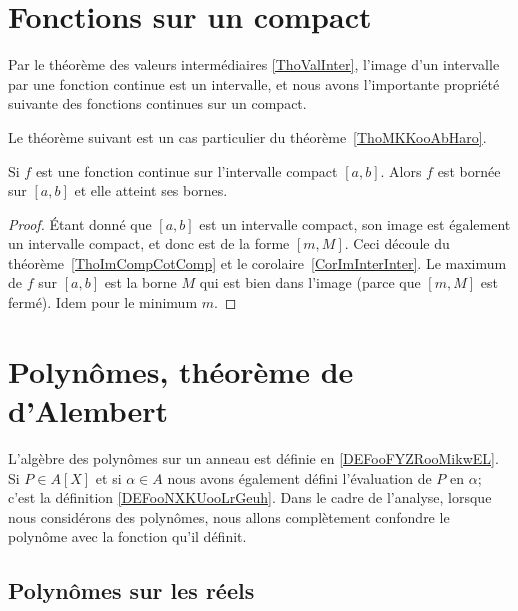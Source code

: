 \section{Fonctions sur un compact}

Par le théorème des valeurs intermédiaires \ref{ThoValInter}, l'image d'un intervalle par une fonction continue est un intervalle, et nous avons l'importante propriété suivante des fonctions continues sur un compact.

Le théorème suivant est un cas particulier du théorème~\ref{ThoMKKooAbHaro}.
\begin{theorem}
    Si $f$ est une fonction continue sur l'intervalle compact $[a,b]$. Alors $f$ est bornée sur $[a,b]$ et elle atteint ses bornes.
\end{theorem}

\begin{proof}
    Étant donné que $[a,b]$ est un intervalle compact, son image est également un intervalle compact, et donc est de la forme $[m,M]$. Ceci découle du théorème~\ref{ThoImCompCotComp} et le corolaire~\ref{CorImInterInter}. Le maximum de $f$ sur $[a,b]$ est la borne $M$ qui est bien dans l'image (parce que $[m,M]$ est fermé). Idem pour le minimum $m$.
\end{proof}

\section{Polynômes, théorème de d'Alembert}

L'algèbre des polynômes sur un anneau est définie en \ref{DEFooFYZRooMikwEL}. Si \( P\in A[X]\) et si \( \alpha\in A\) nous avons également défini l'évaluation de \( P\) en \( \alpha\); c'est la définition \ref{DEFooNXKUooLrGeuh}. Dans le cadre de l'analyse, lorsque nous considérons des polynômes, nous allons complètement confondre le polynôme avec la fonction qu'il définit.

\subsection{Polynômes sur les réels}

